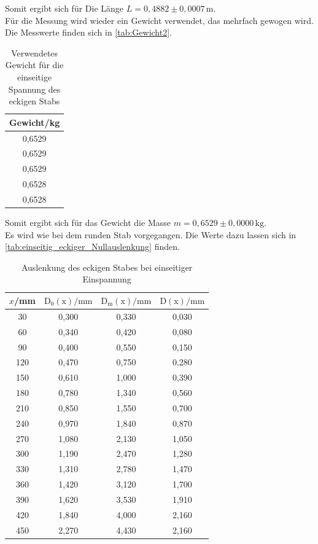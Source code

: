   Somit ergibt sich für Die Länge $L = 0{,}4882 \pm 0,0007 \, \mathrm{m}$.\\

  Für die Messung wird wieder ein Gewicht verwendet, das mehrfach gewogen wird. Die Messwerte finden sich in \autoref{tab:Gewicht2}.

  \begin{table}
    \centering
    \caption{Verwendetes Gewicht für die einseitige Spannung des eckigen Stabs}
    \label{tab:Gewicht2}
    \begin{tabular}{c}
      \toprule
      Gewicht/kg \\
      \midrule
      0,6529 \\
      0,6529 \\
      0,6529 \\
      0,6528 \\
      0,6528 \\
      \bottomrule
    \end{tabular}
  \end{table}

  Somit ergibt sich für das Gewicht die Masse $m = 0{,}6529 \pm 0,0000 \, \mathrm{kg}$.\\

  Es wird wie bei dem runden Stab vorgegangen. Die Werte dazu lassen
  sich in \autoref{tab:einseitig_eckiger_Nullauslenkung} finden.

  \begin{table}
    \centering
    \caption{Auslenkung des eckigen Stabes bei einseitiger Einspannung}
    \label{tab:einseitig_eckiger_Nullauslenkung}
    \begin{tabular}{c c c c}
      \toprule
      $x$/mm & $\mathrm{D_0(x)}/\mathrm{mm}$ & $\mathrm{D_m(x)}/\mathrm{mm}$ & $\mathrm{D(x)}/\mathrm{mm}$ \\
      \midrule
      30 & 0,300 & 0,330 & 0,030 \\
      60 & 0,340 & 0,420 & 0,080 \\
      90 & 0,400 & 0,550 & 0,150 \\
      120 & 0,470 & 0,750 & 0,280 \\
      150 & 0,610 & 1,000 & 0,390 \\
      180 & 0,780 & 1,340 & 0,560 \\
      210 & 0,850 & 1,550 & 0,700 \\
      240 & 0,970 & 1,840 & 0,870 \\
      270 & 1,080 & 2,130 & 1,050 \\
      300 & 1,190 & 2,470 & 1,280 \\
      330 & 1,310 & 2,780 & 1,470 \\
      360 & 1,420 & 3,120 & 1,700 \\
      390 & 1,620 & 3,530 & 1,910 \\
      420 & 1,840 & 4,000 & 2,160 \\
      450 & 2,270 & 4,430 & 2,160 \\
      \bottomrule
    \end{tabular}
  \end{table}

